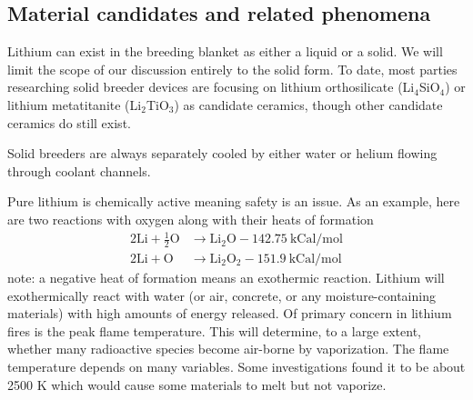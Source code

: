 \subsection{Material candidates and related phenomena}
Lithium can exist in the breeding blanket as either a liquid or a solid. We will limit the scope of our discussion entirely to the solid form. To date, most parties researching solid breeder devices are focusing on lithium orthosilicate (Li$_4$SiO$_4$) or lithium metatitanite (Li$_2$TiO$_3$) as candidate ceramics, though other candidate ceramics do still exist.

Solid breeders are always separately cooled by either water or helium flowing through coolant channels. 

Pure lithium is chemically active meaning safety is an issue. As an example, here are two reactions with oxygen along with their heats of formation
\begin{align*}
	2\mathrm{Li} + \frac{1}{2}\mathrm{O} &\rightarrow \mathrm{Li}_2\mathrm{O} - 142.75~\text{kCal/mol}\\
	2\mathrm{Li} + \mathrm{O} &\rightarrow \mathrm{Li}_2\mathrm{O}_2 - 151.9~\text{kCal/mol}
\end{align*}
note: a negative heat of formation means an exothermic reaction. Lithium will exothermically react with water (or air, concrete, or any moisture-containing materials) with high amounts of energy released. Of primary concern in lithium fires is the peak flame temperature. This will determine, to a large extent, whether many radioactive species become air-borne by vaporization. The flame temperature depends on many variables. Some investigations found it to be  about 2500 K which would cause some materials to melt but not vaporize.



